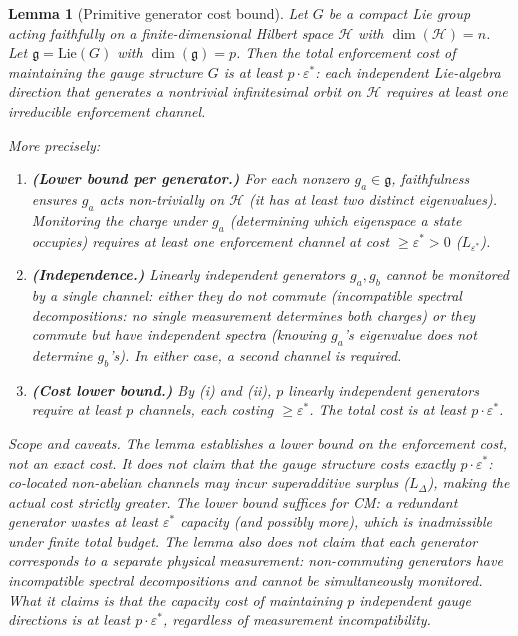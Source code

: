 \documentclass[11pt,a4paper]{article}
\newtheorem{lemma}[theorem]{Lemma}
\theoremstyle{definition}
\begin{document}
\begin{lemma}[Primitive generator cost bound]\label{lem:gen_channel}
Let $G$ be a compact Lie group acting faithfully on a
finite-dimensional Hilbert space $\mathcal{H}$ with
$\dim(\mathcal{H}) = n$.  Let $\mathfrak{g} = \mathrm{Lie}(G)$ with
$\dim(\mathfrak{g}) = p$.  Then the total enforcement cost of
maintaining the gauge structure $G$ is at least
$p \cdot \varepsilon^*$: each independent Lie-algebra direction that
generates a nontrivial infinitesimal orbit on $\mathcal{H}$
requires at least one irreducible enforcement channel.

More precisely:
\begin{enumerate}[label=(\roman*),nosep]
  \item \textbf{(Lower bound per generator.)}  For each nonzero
  $g_a \in \mathfrak{g}$, faithfulness ensures $g_a$ acts
  non-trivially on $\mathcal{H}$ (it has at least two distinct
  eigenvalues).  Monitoring the charge under $g_a$ (determining which
  eigenspace a state occupies) requires at least one enforcement
  channel at cost $\ge \varepsilon^* > 0$ ($L_{\varepsilon^*}$).
  \item \textbf{(Independence.)}  Linearly independent generators
  $g_a, g_b$ cannot be monitored by a single channel: either they
  do not commute (incompatible spectral decompositions: no single
  measurement determines both charges) or they commute but have
  independent spectra (knowing $g_a$'s eigenvalue does not determine
  $g_b$'s).  In either case, a second channel is required.
  \item \textbf{(Cost lower bound.)}  By (i) and (ii), $p$ linearly
  independent generators require at least $p$ channels, each costing
  $\ge \varepsilon^*$.  The total cost is at least
  $p \cdot \varepsilon^*$.
\end{enumerate}

\noindent\textit{Scope and caveats.}\quad
The lemma establishes a \emph{lower bound} on the enforcement cost,
not an exact cost.  It does not claim that the gauge structure costs
\emph{exactly} $p \cdot \varepsilon^*$: co-located non-abelian
channels may incur superadditive surplus ($L_\Delta$), making the
actual cost strictly greater.  The lower bound suffices for CM: a
redundant generator wastes \emph{at least} $\varepsilon^*$ capacity
(and possibly more), which is inadmissible under finite total budget.
The lemma also does not claim that each generator corresponds to a
\emph{separate physical measurement}: non-commuting generators have
incompatible spectral decompositions and cannot be simultaneously
monitored.  What it claims is that the \emph{capacity cost}
of maintaining $p$ independent gauge directions is at least
$p \cdot \varepsilon^*$, regardless of measurement incompatibility.
\end{lemma}
\end{document}
